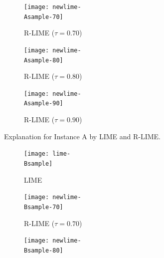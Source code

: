 \documentclass[runningheads]{llncs}
\begin{document}
{{\begin{figure}[p]
\begin{subfigure}[t]{\imgwidth}
        \end{subfigure}
        \begin{subfigure}[t]{\imgwidth}
          \hspace{0.5em}
          \texttt{[image: newlime-\\Asample-70]}
          \caption{R-LIME ($\tau=0.70$)}\label{fig:A-rlime-70}
        \end{subfigure}
        \begin{subfigure}[t]{\imgwidth}
          \texttt{[image: newlime-\\Asample-80]}
          \caption{R-LIME ($\tau=0.80$)}
        \end{subfigure}
        \begin{subfigure}[t]{\imgwidth}
          \hspace{-0.5em}
          \texttt{[image: newlime-\\Asample-90]}
          \caption{R-LIME ($\tau=0.90$)}
        \end{subfigure}
        \caption[Explanation for Instance A by LIME and R-LIME]{%
          Explanation for Instance A by LIME and R-LIME\@.
        }\label{fig:A}
      \end{figure}
      \begin{figure}[p]
        \centering
        \begin{subfigure}[t]{\imgwidth}
          \hspace{-0.7em}
          \texttt{[image: lime-\\Bsample]}
          \caption{LIME}\label{fig:B-lime}
        \end{subfigure}
        \begin{subfigure}[t]{\imgwidth}
          \hspace{0.5em}
          \texttt{[image: newlime-\\Bsample-70]}
          \caption{R-LIME ($\tau=0.70$)}
        \end{subfigure}
        \begin{subfigure}[t]{\imgwidth}
          \hspace{-0.8em}
          \texttt{[image: newlime-\\Bsample-80]}

\end{subfigure}
\end{figure}}}
\end{document}
